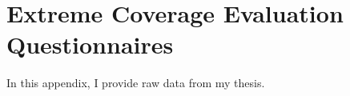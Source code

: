 
\appendix
\chapter {Extreme Coverage Evaluation Questionnaires}

In this appendix, I provide raw data from my thesis.

